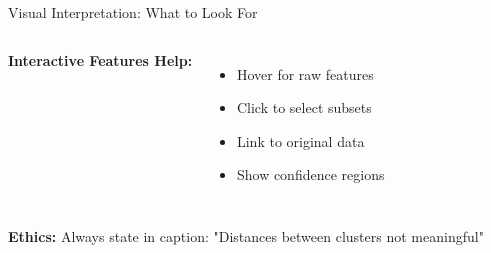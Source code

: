 \documentclass[aspectratio=169]{beamer}
\newcommand{\ethics}[1]{\colorbox{purple!10}{\textcolor{ethicscolor}{\textbf{Ethics:} #1}}}
\begin{document}
\begin{frame}{Visual Interpretation: What to Look For}
\begin{columns}

\vspace{0.2cm}
\textbf{Interactive Features Help:}
\begin{itemize}
\item Hover for raw features
\item Click to select subsets
\item Link to original data
\item Show confidence regions
\end{itemize}
\end{columns}

\vspace{0.3cm}
\ethics{Always state in caption: "Distances between clusters not meaningful"}
\end{frame}
\end{document}
